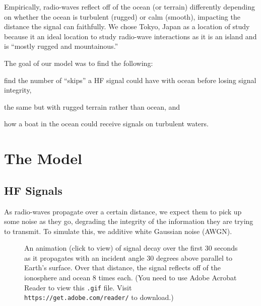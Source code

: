 \documentclass[11pt, twocolumn]{article}
\numberwithin{equation}{section}
\begin{document}
Empirically, radio-waves reflect off of the ocean (or terrain) differently depending on whether the ocean is turbulent (rugged) or calm (smooth), impacting the distance the signal can faithfully.\cite{mcm_statement} We chose Tokyo, Japan as a location of study because it an ideal location to study radio-wave interactions as it is an island and is ``mostly rugged and mountainous.''\cite{factbook2010world}

The goal of our model was to find the following: 
\begin{enumerate*}[(1)]
    \item find the number of ``skips'' a HF signal could have with ocean before losing signal integrity, 
    \item the same but with rugged terrain rather than ocean, and
    \item how a boat in the ocean could receive signals on turbulent waters.
\end{enumerate*}


\section{The Model} %
\label{sec:model}

\subsection{HF Signals} %
\label{sub:radiowaves}

As radio-waves propagate over a certain distance, we expect them to pick up some noise as they go, degrading the integrity of the information they are trying to transmit. To simulate this, we additive white Gaussian noise (AWGN).\cite{shannon1984communication,kailath1968innovations}
 \begin{figure}
     \begin{center}
     \end{center}
     \caption{\small An animation (click to view) of signal decay over the first 30 seconds as it propagates with an incident angle 30 degrees above parallel to Earth’s surface. Over that distance, the signal reflects off of the ionosphere and ocean 8 times each. (You need to use Adobe Acrobat Reader to view this \texttt{.gif} file. Visit \texttt{https://get.adobe.com/reader/} to download.)}
 \end{figure}

\end{document}
